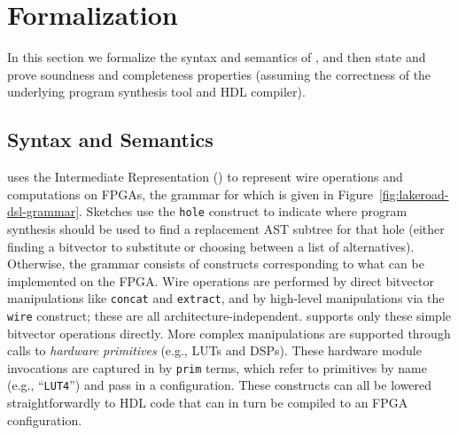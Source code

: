 \section{Formalization}
\label{sec:formalization}

In this section we formalize
  the syntax and semantics of \lr,
  and then state and prove
  soundness and completeness properties (assuming the correctness of the underlying program synthesis tool and HDL compiler).





\subsection{Syntax and Semantics}

%

%

\lr uses the \lr Intermediate Representation (\lrir) to represent
  wire operations and computations on FPGAs, the grammar for which is given in Figure~\ref{fig:lakeroad-dsl-grammar}.
Sketches use the \texttt{hole} construct
  to indicate where
  program synthesis should be used
  to find a replacement AST subtree
  for that hole 
  (either finding a bitvector to substitute or choosing between a list of alternatives).
Otherwise, the grammar consists
  of constructs corresponding to
  what can be implemented on the FPGA.
Wire operations are performed
  by direct
  bitvector manipulations
  like \texttt{concat}
  and \texttt{extract},
  and by high-level manipulations
  via the \texttt{wire} construct;
  these are all architecture-independent.
\lrir supports
  only these simple bitvector operations directly.
More complex manipulations
  are supported through calls 
  to \textit{hardware primitives} (e.g., LUTs and DSPs).
These hardware module invocations
  are captured in \lrir
  by \texttt{prim} terms,
  which refer to primitives
  by name (e.g., ``\texttt{LUT4}'')
  and pass in a configuration.
These constructs can all be lowered
  straightforwardly to HDL code
  that can in turn be compiled
  to an FPGA configuration.

